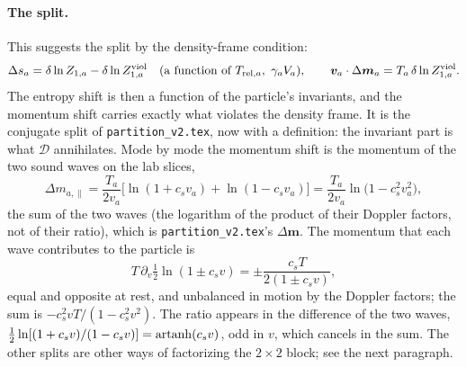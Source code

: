 \documentclass[11pt,aps,preprint,nofootinbib,superscriptaddress,tightenlines]{revtex4-2}
\def\st{\begin{equation}}
\def\stp{\end{equation}}
\let\oldparagraph\paragraph
\renewcommand{\paragraph}{\par\bigskip\oldparagraph}
\begin{document}
\paragraph{The split.}  This suggests the split by the density-frame condition:
\st
\Delta s_a=\delta\ln Z_{1,a}-\delta\ln Z^{\rm viol}_{1,a}\quad(\text{a function of }T_{{\rm rel},a},\ \gamma_aV_a),\qquad \bm v_a\cdot\Delta\bm m_a=T_a\,\delta\ln Z^{\rm viol}_{1,a} .
\stp
The entropy shift is then a function of the particle's invariants, and the momentum shift carries exactly what violates the density frame.  It is the conjugate split
of \nolinkurl{partition_v2.tex}, now with a definition: the invariant part is what $\mathcal D$ annihilates.  Mode by mode the momentum shift is the momentum of the two
sound waves on the lab slices,
\st
\Delta m_{a,\parallel}=\frac{T_a}{2v_a}\Big[\ln(1+c_sv_a)+\ln(1-c_sv_a)\Big]=\frac{T_a}{2v_a}\ln\big(1-c_s^2v_a^2\big) ,
\stp
the sum of the two waves (the logarithm of the product of their Doppler factors, not of their ratio), which is \nolinkurl{partition_v2.tex}'s $\Delta\bm m$.  The momentum
that each wave contributes to the particle is
\st
T\,\partial_v\tfrac12\ln(1\pm c_sv)=\pm\frac{c_sT}{2(1\pm c_sv)} ,
\stp
equal and opposite at rest, and unbalanced in motion by the Doppler factors; the sum is $-c_s^2vT/(1-c_s^2v^2)$.  The ratio appears in the difference of the two waves,
$\tfrac12\ln[(1+c_sv)/(1-c_sv)]={\rm artanh}(c_sv)$, odd in $v$, which cancels in the sum.  The other splits are other ways of factorizing the $2\times2$ block; see the next paragraph.
\end{document}
